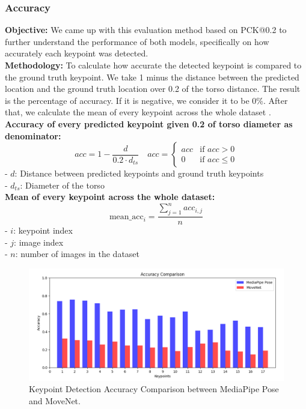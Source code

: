 \documentclass[12pt]{article}
\begin{document}
\subsubsection{Accuracy}

\hspace*{1.5em}\textbf{Objective:} We came up with this evaluation method based on PCK@0.2 to further understand the performance of both models, specifically on how accurately each keypoint was detected.\\

\textbf{Methodology:} To calculate how accurate the detected keypoint is compared to the ground truth keypoint. We take 1 minus the distance between the predicted location and the ground truth location over 0.2 of the torso distance. The result is the percentage of accuracy. If it is negative, we consider it to be 0\%. After that, we calculate the mean of every keypoint across the whole dataset \cite{chung2022}.\\

\textbf{Accuracy of every predicted keypoint given 0.2 of torso diameter as denominator:}
\[
    \displaystyle
    acc = 1 - \frac{d}{0.2 \cdot d_{ts}}
    \quad
    \displaystyle
    acc = \begin{cases}
        acc & \text{if } acc > 0    \\
        0   & \text{if } acc \leq 0
    \end{cases}
\]
- \(d\): Distance between predicted keypoints and ground truth keypoints\\
- \(d_{ts}\): Diameter of the torso\\

\textbf{Mean of every keypoint across the whole dataset:}
\[
    \displaystyle
    \text{mean\_acc}_i = \frac{\sum_{j=1}^{n} acc_{i,j}}{n}
\]
- \(i\): keypoint index\\
- \(j\): image index\\
- \(n\): number of images in the dataset\\

\begin{figure}[ht]
    \centering
    \includegraphics[width=1\textwidth]{accucom.png}
    \caption{Keypoint Detection Accuracy Comparison between MediaPipe Pose and MoveNet.}
\end{figure}
\end{document}
